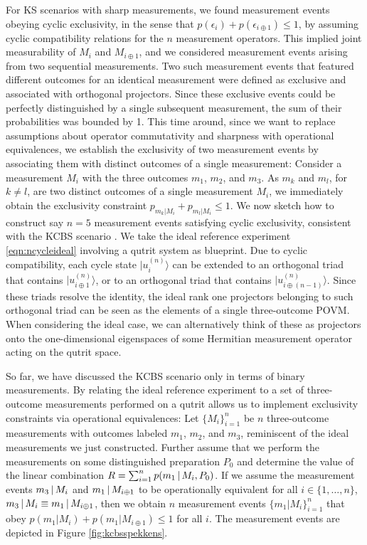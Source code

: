 For KS scenarios with sharp measurements, we found measurement events obeying cyclic exclusivity, in the sense that $p(\epsilon_i)+p(\epsilon_{i\oplus 1})\leq 1$, by assuming cyclic compatibility relations for the $n$ measurement operators. This implied joint measurability of $M_i$ and $M_{i\oplus 1}$, and we considered measurement events arising from two sequential measurements. Two such measurement events that featured different outcomes for an identical measurement were defined as exclusive and associated with orthogonal projectors. Since these exclusive events could be perfectly distinguished by a single subsequent measurement, the sum of their probabilities was bounded by 1.
This time around, since we want to replace assumptions about operator commutativity and sharpness with operational equivalences, we establish the exclusivity of two measurement events by associating them with distinct outcomes of a single measurement:
Consider a measurement $M_i$ with the three outcomes $m_1$, $m_2$, and $m_3$. As $m_k$ and $m_l$, for $k\neq l$, are two distinct outcomes of a single measurement $M_i$, we immediately obtain the exclusivity constraint $p_{m_k\vert M_i}+p_{m_l\vert M_i}\leq 1$. We now sketch how to construct say $n=5$ measurement events satisfying cyclic exclusivity, consistent with the KCBS scenario \cite{Kunjwal2019}.
We take the ideal reference experiment \ref{eqn:ncycleideal} involving a qutrit system as blueprint. Due to cyclic compatibility, each cycle state $\vert u_i^{(n)} \rangle$ can be extended to an orthogonal triad that contains $\vert u_{i\oplus 1}^{(n)} \rangle$, or to an orthogonal triad that contains $\vert u_{i\oplus (n-1)}^{(n)} \rangle$. Since these triads resolve the identity, the ideal rank one projectors belonging to such orthogonal triad can be seen as the elements of a single three-outcome POVM. When considering the ideal case, we can alternatively think of these as projectors onto the one-dimensional eigenspaces of some Hermitian measurement operator acting on the qutrit space.

So far, we have discussed the KCBS scenario only in terms of binary measurements. By relating the ideal reference experiment to a set of three-outcome measurements performed on a qutrit allows us to implement exclusivity constraints via operational equivalences: Let $\{M_i\}_{i=1}^n$ be $n$ three-outcome measurements with outcomes labeled $m_1$, $m_2$, and $m_3$, reminiscent of the ideal measurements we just constructed. Further assume that we perform the measurements on some distinguished preparation $P_0$ and determine the value of the linear combination $R=\sum_{i=1}^n p(m_1\thinspace \vert \thinspace M_i,P_0)$.
If we assume the measurement events $m_3 \thinspace \vert \thinspace M_i$ and $m_1 \thinspace \vert \thinspace M_{i\oplus 1}$ to be operationally equivalent for all $i\in\{1,\dots,n\}$,  $m_3 \thinspace \vert \thinspace M_i \equiv m_1 \thinspace \vert \thinspace M_{i\oplus 1}$, then we obtain $n$ measurement events $\{m_1\vert M_i\}_{i=1}^n$ that obey $p(m_1\vert M_i)+p(m_1\vert M_{i\oplus 1})\leq 1$ for all $i$. The measurement events are depicted in Figure \ref{fig:kcbsspekkens}. 

